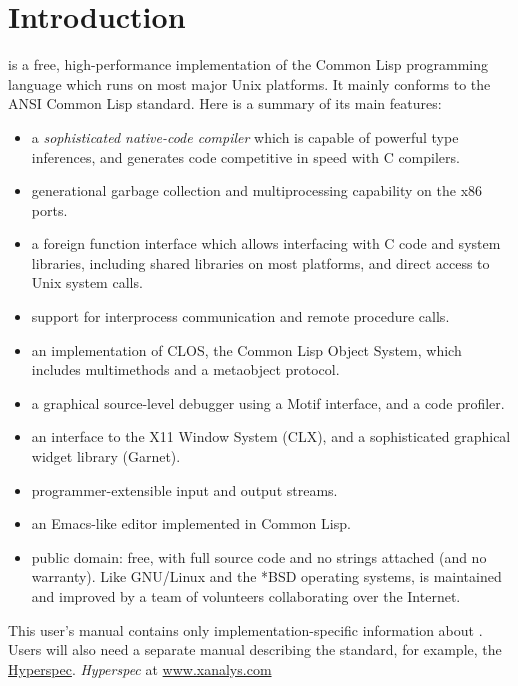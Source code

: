\chapter{Introduction}

\cmucl{} is a free, high-performance implementation of the Common Lisp
programming language which runs on most major Unix platforms. It
mainly conforms to the ANSI Common Lisp standard. Here is a summary of
its main features:

\begin{itemize}
\item a {\em sophisticated native-code compiler} which is capable of
powerful type inferences, and generates code competitive in speed with
C compilers.

\item generational garbage collection and multiprocessing
capability on the x86 ports.

\item a foreign function interface which allows interfacing with C code and
system libraries, including shared libraries on most platforms, and
direct access to Unix system calls.

\item support for interprocess communication and remote procedure
calls.
     
\item an implementation of CLOS, the Common Lisp Object System, which
includes multimethods and a metaobject protocol.

\item a graphical source-level debugger using a Motif interface, and a
code profiler.

\item an interface to the X11 Window System (CLX), and a sophisticated
graphical widget library (Garnet).

\item programmer-extensible input and output streams.
                        
\item an Emacs-like editor implemented in Common Lisp.

\item public domain: free, with full source code and no
strings attached (and no warranty).  Like GNU/Linux and the *BSD
operating systems, \cmucl{} is maintained and improved by a team of
volunteers collaborating over the Internet.
\end{itemize}


This user's manual contains only implementation-specific information
about \cmucl. Users will also need a separate manual describing the
\clisp{} standard, for example, the
\ifpdf
\href{http://www.xanalys.com/software_tools/reference/HyperSpec/FrontMatter/index-text.html}
{Hyperspec}.
\else
\emph{Hyperspec} at \href{http://www.xanalys.com/software_tools}{www.xanalys.com}
\fi


